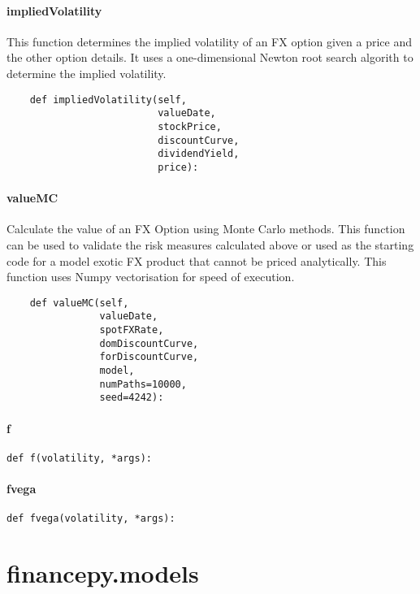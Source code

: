 \documentclass[twoside,11pt]{book}
\begin{document}
\subsubsection*{{\bf impliedVolatility}}
This function determines the implied volatility of an FX option given a price and the other option details. It uses a one-dimensional Newton root search algorith to determine the implied volatility.  

\begin{lstlisting}
    def impliedVolatility(self,
                          valueDate,
                          stockPrice,
                          discountCurve,
                          dividendYield,
                          price):
\end{lstlisting}

\subsubsection*{{\bf valueMC}}
Calculate the value of an FX Option using Monte Carlo methods. This function can be used to validate the risk measures calculated above or used as the starting code for a model exotic FX product that cannot be priced analytically. This function uses Numpy vectorisation for speed of execution. 

\begin{lstlisting}
    def valueMC(self,
                valueDate,
                spotFXRate,
                domDiscountCurve,
                forDiscountCurve,
                model,
                numPaths=10000,
                seed=4242):
\end{lstlisting}

\subsubsection*{{\bf f}}


\begin{lstlisting}
def f(volatility, *args):
\end{lstlisting}

\subsubsection*{{\bf fvega}}


\begin{lstlisting}
def fvega(volatility, *args):
\end{lstlisting}


\chapter{financepy.models}
\end{document}
